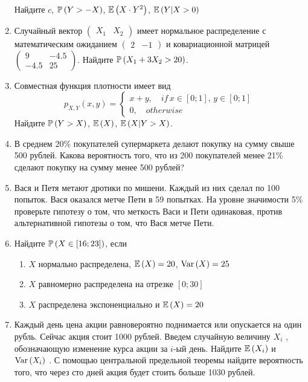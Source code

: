 \documentclass[12pt, a4paper]{article}\usepackage[]{graphicx}\usepackage[]{color}
\begin{document}
\begin{enumerate}
Найдите  $c$,  $\P\left(Y>-X\right)$,  $\E\left(X\cdot Y^{2} \right)$,  $\E\left(Y|X>0\right)$
\item Случайный вектор  $\left(\begin{array}{cc} {X_{1} } & {X_{2} } \end{array}\right)$  имеет нормальное распределение с математическим ожиданием  $\left(\begin{array}{cc} {2} & {-1} \end{array}\right)$  и ковариационной матрицей  $\left(\begin{array}{cc} {9} & {-4.5} \\ {-4.5} & {25} \end{array}\right)$.
Найдите  $\P\left(X_{1} +3X_{2} >20\right)$.
\item Совместная функция плотности имеет вид
\[
p_{X,Y} \left(x,y\right)=\left\{\begin{array}{l} {x+y,\quad if\, x\in \left[0;1\right],\, y\in \left[0;1\right]} \\ {0,\quad otherwise} \end{array}\right.
\]
Найдите  $\P\left(Y>X\right)$,  $\E\left(X\right)$,  $\E\left(X|Y>X\right)$.
\item В среднем 20\% покупателей супермаркета делают покупку на сумму свыше 500 рублей. Какова вероятность того, что из 200 покупателей менее 21\% сделают покупку на сумму менее 500 рублей?
\item Вася и Петя метают дротики по мишени. Каждый из них сделал по 100 попыток. Вася оказался метче Пети в 59 попытках. На уровне значимости 5\% проверьте гипотезу о том, что меткость Васи и Пети одинаковая, против альтернативной гипотезы о том, что Вася метче Пети.
\item Найдите  $\P\left(X\in \left[16;23\right]\right)$, если
\begin{enumerate}
\item $X$  нормально распределена,  $\E\left(X\right)=20$,  $\Var\left(X\right)=25$
\item $X$  равномерно распределена на отрезке  $\left[0;30\right]$
\item $X$  распределена экспоненциально и  $\E\left(X\right)=20$
\end{enumerate}
\item Каждый день цена акции равновероятно поднимается или опускается на один рубль. Сейчас акция стоит 1000 рублей. Введем случайную величину  $X_{i} $ , обозначающую изменение курса акции за  $i$-ый день. Найдите  $\E\left(X_{i} \right)$  и  $\Var\left(X_{i} \right)$ . С помощью центральной предельной теоремы найдите вероятность того, что через сто дней акция будет стоить больше 1030 рублей.


\end{enumerate}
\end{document}
